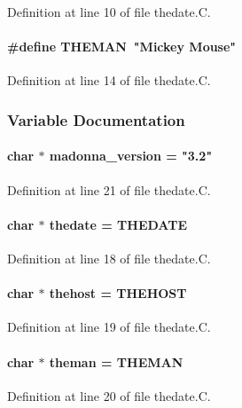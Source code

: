 Definition at line 10 of file thedate.C.\label{thedate.C_a2}
\paragraph{\setlength{\rightskip}{0pt plus 5cm}\#define THEMAN\ "Mickey Mouse"}\hfill



Definition at line 14 of file thedate.C.

\subsubsection{Variable Documentation}
\label{thedate.C_a6}
\paragraph{\setlength{\rightskip}{0pt plus 5cm}char $\ast$ madonna\_\-version = "3.2"}\hfill



Definition at line 21 of file thedate.C.\label{thedate.C_a3}
\paragraph{\setlength{\rightskip}{0pt plus 5cm}char $\ast$ thedate = THEDATE}\hfill



Definition at line 18 of file thedate.C.\label{thedate.C_a4}
\paragraph{\setlength{\rightskip}{0pt plus 5cm}char $\ast$ thehost = THEHOST}\hfill



Definition at line 19 of file thedate.C.\label{thedate.C_a5}
\paragraph{\setlength{\rightskip}{0pt plus 5cm}char $\ast$ theman = THEMAN}\hfill



Definition at line 20 of file thedate.C.